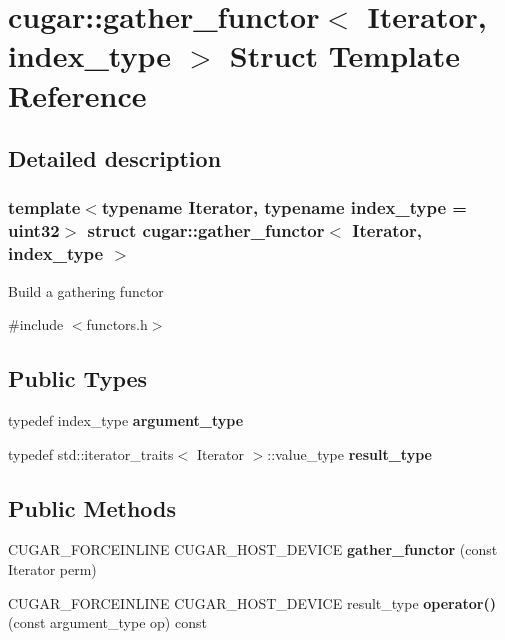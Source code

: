\hypertarget{structcugar_1_1gather__functor}{}\section{cugar\+:\+:gather\+\_\+functor$<$ Iterator, index\+\_\+type $>$ Struct Template Reference}
\label{structcugar_1_1gather__functor}


\subsection{Detailed description}
\subsubsection*{template$<$typename Iterator, typename index\+\_\+type = uint32$>$\newline
struct cugar\+::gather\+\_\+functor$<$ Iterator, index\+\_\+type $>$}

Build a gathering functor 

{\ttfamily \#include $<$functors.\+h$>$}

\subsection*{Public Types}
\begin{DoxyCompactItemize}
\item 
\mbox{\label{structcugar_1_1gather__functor_a7bfab5263a3ba8c7ab653c89ec071365}} 
typedef index\+\_\+type {\bfseries argument\+\_\+type}
\item 
\mbox{\label{structcugar_1_1gather__functor_abffa40cb6cfa362a96da4775bb81fe45}} 
typedef std\+::iterator\+\_\+traits$<$ Iterator $>$\+::value\+\_\+type {\bfseries result\+\_\+type}
\end{DoxyCompactItemize}
\subsection*{Public Methods}
\begin{DoxyCompactItemize}
\item 
\mbox{\label{structcugar_1_1gather__functor_a45411da0f72d484fe861314ce4a46df1}} 
C\+U\+G\+A\+R\+\_\+\+F\+O\+R\+C\+E\+I\+N\+L\+I\+NE C\+U\+G\+A\+R\+\_\+\+H\+O\+S\+T\+\_\+\+D\+E\+V\+I\+CE {\bfseries gather\+\_\+functor} (const Iterator perm)
\item 
\mbox{\label{structcugar_1_1gather__functor_a20d57149b534ea2b103b6d9c2ecda5b4}} 
C\+U\+G\+A\+R\+\_\+\+F\+O\+R\+C\+E\+I\+N\+L\+I\+NE C\+U\+G\+A\+R\+\_\+\+H\+O\+S\+T\+\_\+\+D\+E\+V\+I\+CE result\+\_\+type {\bfseries operator()} (const argument\+\_\+type op) const
\end{DoxyCompactItemize}
